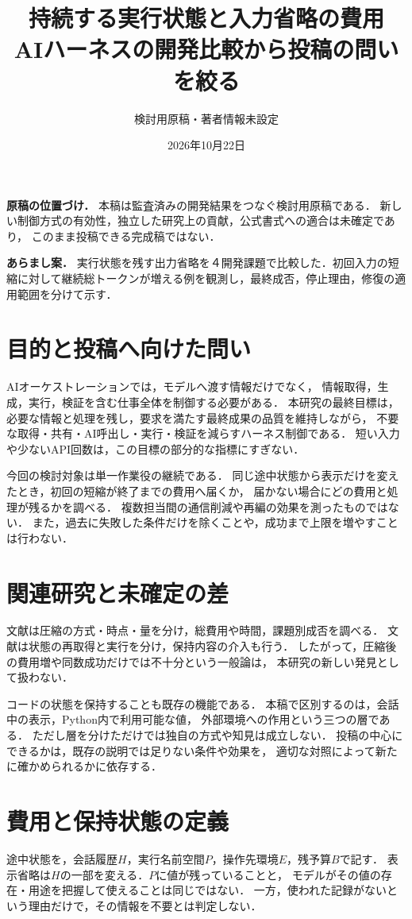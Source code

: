 \documentclass[uplatex,a4paper,twocolumn,10pt]{jsarticle}
\title{持続する実行状態と入力省略の費用\\AIハーネスの開発比較から投稿の問いを絞る}
\author{検討用原稿・著者情報未設定}
\date{2026年10月22日}
\begin{document}
\raggedbottom
\maketitle
\noindent\textbf{原稿の位置づけ．}
本稿は監査済みの開発結果をつなぐ検討用原稿である．
新しい制御方式の有効性，独立した研究上の貢献，公式書式への適合は未確定であり，
このまま投稿できる完成稿ではない．

\noindent\textbf{あらまし案．}
実行状態を残す出力省略を４開発課題で比較した．初回入力の短縮に対して継続総トークンが増える例を観測し，最終成否，停止理由，修復の適用範囲を分けて示す．

\section{目的と投稿へ向けた問い}
AIオーケストレーションでは，モデルへ渡す情報だけでなく，
情報取得，生成，実行，検証を含む仕事全体を制御する必要がある．
本研究の最終目標は，必要な情報と処理を残し，要求を満たす最終成果の品質を維持しながら，
不要な取得・共有・AI呼出し・実行・検証を減らすハーネス制御である．
短い入力や少ないAPI回数は，この目標の部分的な指標にすぎない．

今回の検討対象は単一作業役の継続である．
同じ途中状態から表示だけを変えたとき，初回の短縮が終了までの費用へ届くか，
届かない場合にどの費用と処理が残るかを調べる．
複数担当間の通信削減や再編の効果を測ったものではない．
また，過去に失敗した条件だけを除くことや，成功まで上限を増やすことは行わない．

\newpage
\section{関連研究と未確定の差}
文献\cite{beyond}は圧縮の方式・時点・量を分け，総費用や時間，課題別成否を調べる．
文献\cite{compression}は状態の再取得と実行を分け，保持内容の介入も行う．
したがって，圧縮後の費用増や同数成功だけでは不十分という一般論は，
本研究の新しい発見として扱わない．

コードの状態を保持することも既存の機能である\cite{codeact,cave}．
本稿で区別するのは，会話中の表示，Python内で利用可能な値，
外部環境への作用という三つの層である．
ただし層を分けただけでは独自の方式や知見は成立しない．
投稿の中心にできるかは，既存の説明では足りない条件や効果を，
適切な対照によって新たに確かめられるかに依存する．

\section{費用と保持状態の定義}
途中状態を，会話履歴$H$，実行名前空間$P$，操作先環境$E$，残予算$B$で記す．
表示省略は$H$の一部を変える．$P$に値が残っていることと，
モデルがその値の存在・用途を把握して使えることは同じではない．
一方，使われた記録がないという理由だけで，その情報を不要とは判定しない．
\end{document}
